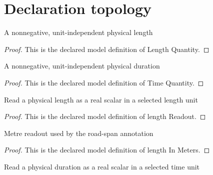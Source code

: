 \section{Declaration topology}
\begin{definition}
  \label{def:physics:phyx-mini-0668:phyxminiproblems-problemphyxmini0668-lengthquantity}
  A nonnegative, unit-independent physical length
\end{definition}
\begin{proof}
  This is the declared model definition of Length Quantity.
\end{proof}
\begin{definition}
  \label{def:physics:phyx-mini-0668:phyxminiproblems-problemphyxmini0668-timequantity}
  A nonnegative, unit-independent physical duration
\end{definition}
\begin{proof}
  This is the declared model definition of Time Quantity.
\end{proof}
\begin{definition}
  \label{def:physics:phyx-mini-0668:phyxminiproblems-problemphyxmini0668-lengthreadout}
  Read a physical length as a real scalar in a selected length unit
\end{definition}
\begin{proof}
  This is the declared model definition of length Readout.
\end{proof}
\begin{definition}
  \label{def:physics:phyx-mini-0668:phyxminiproblems-problemphyxmini0668-lengthinmeters}
  Metre readout used by the road-span annotation
\end{definition}
\begin{proof}
  This is the declared model definition of length In Meters.
\end{proof}
\begin{definition}
  \label{def:physics:phyx-mini-0668:phyxminiproblems-problemphyxmini0668-timereadout}
  Read a physical duration as a real scalar in a selected time unit
\end{definition}
